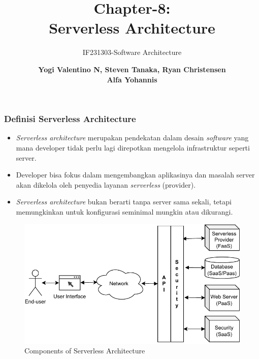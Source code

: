 \documentclass[aspectratio=169, table]{beamer}
\subtitle{IF231303-Software Architecture  \vspace{10pt}}
\title{\huge Chapter-8:\\Serverless Architecture}
\author{\textbf{Yogi Valentino N, Steven Tanaka, Ryan Christensen\\Alfa Yohannis}}
\begin{document}
    \begin{frame}[plain]
        \maketitle
    \end{frame}

    \begin{frame}
        \frametitle{Definisi Serverless Architecture}
        \begin{itemize}
            \item \emph{Serverless architecture} merupakan pendekatan dalam desain \emph{software} yang mana developer tidak perlu lagi direpotkan mengelola infrastruktur seperti server.
            \item Developer bisa fokus dalam mengembangkan aplikasinya dan masalah server akan dikelola oleh penyedia layanan \emph{serverless} (provider).
            \item \emph{Serverless architecture} bukan berarti tanpa server sama sekali, tetapi memungkinkan untuk konfigurasi seminimal mungkin atau dikurangi.
        \end{itemize}
    \end{frame}

    \begin{frame}
        \centering
        \begin{figure}
            \includegraphics[width=\linewidth]{serverless_architecture}
            \caption{Components of Serverless Architecture}
        \end{figure}
    \end{frame}
\end{document}
